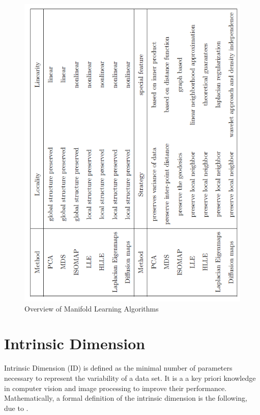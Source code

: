 \begin{figure}[ht]
\begin{center}
\includegraphics[width=\textwidth]{./Figures/comp_table.png}
\caption {Overview of Manifold Learning Algorithms}
\label{comp} 
\end{center}
\end{figure}

\section{Intrinsic Dimension}
\label{s:id}

Intrinsic Dimension (ID) is defined as the minimal number of parameters necessary to represent the variability of a data set. It is a a key priori
knowledge in computer vision and image processing to improve their performance. Mathematically, a formal definition of the intrinsic dimension is the following, due to \citep{Cama2016}.

